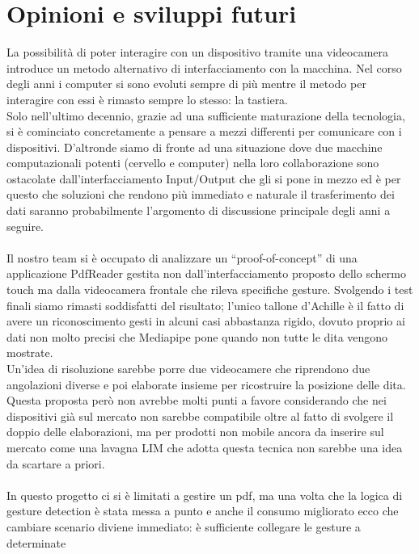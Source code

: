 
\section{Opinioni e sviluppi futuri}
La possibilità di poter interagire con un dispositivo tramite una videocamera introduce un metodo alternativo di 
interfacciamento con la macchina. Nel corso degli anni i computer si sono evoluti sempre di più mentre il 
metodo per interagire con essi è rimasto sempre lo stesso: la tastiera.\\
Solo nell'ultimo decennio, grazie ad una 
sufficiente maturazione della tecnologia, si è cominciato concretamente a pensare a mezzi differenti per comunicare 
con i dispositivi. D'altronde siamo di fronte ad una situazione dove due macchine computazionali potenti (cervello e 
computer) nella loro collaborazione sono ostacolate dall'interfacciamento Input/Output che gli si pone in mezzo ed è
per questo che soluzioni che rendono più immediato e naturale il trasferimento dei dati saranno probabilmente l'argomento 
di discussione principale degli anni a seguire.\\
\\
\noindent Il nostro team si è occupato di analizzare un “proof-of-concept” di una 
applicazione PdfReader gestita non dall'interfacciamento proposto dello schermo touch ma dalla videocamera 
frontale che rileva specifiche gesture. Svolgendo i test finali siamo rimasti soddisfatti del risultato; l'unico tallone 
d'Achille è il fatto di avere un riconoscimento gesti in alcuni casi abbastanza rigido, dovuto proprio ai dati non molto 
precisi che Mediapipe pone quando non tutte le dita vengono mostrate.\\
Un'idea di risoluzione sarebbe porre due videocamere che riprendono due angolazioni diverse e poi 
elaborate insieme per ricostruire la posizione delle dita. Questa proposta però non avrebbe molti punti a favore 
considerando che nei dispositivi già sul mercato non sarebbe compatibile oltre al fatto di svolgere il doppio delle 
elaborazioni, ma per prodotti non mobile ancora da inserire sul mercato come una lavagna LIM che adotta questa 
tecnica non sarebbe una idea da scartare a priori.\\
\\
\noindent In questo progetto ci si è limitati a gestire un pdf, ma una volta che la logica di gesture detection è stata messa a punto 
e anche il consumo migliorato ecco che cambiare scenario diviene immediato: è sufficiente collegare le gesture a determinate 
